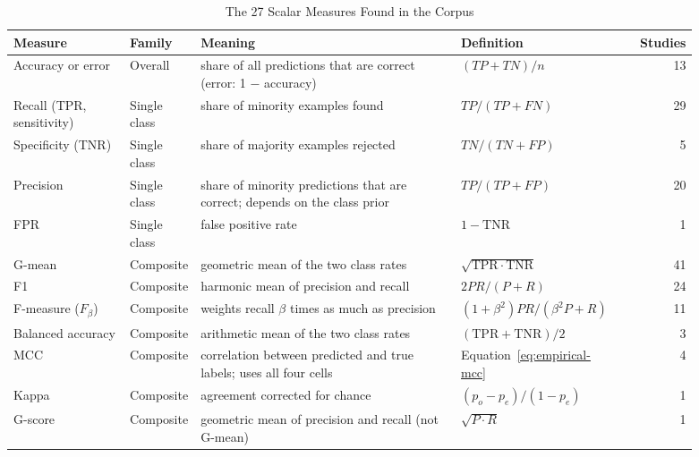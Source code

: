 \begin{table}[p]
  \caption{The 27 Scalar Measures Found in the Corpus}
  \label{tab:empirical-measure-defs}
  \footnotesize
  \setlength{\tabcolsep}{3pt}
  \begin{tabular}{@{}>{\raggedright\arraybackslash}p{0.17\linewidth}>{\raggedright\arraybackslash}p{0.1\linewidth}>{\raggedright\arraybackslash}p{0.38\linewidth}>{\raggedright\arraybackslash}p{0.24\linewidth}r@{}}
    \toprule
    Measure & Family & Meaning & Definition & Studies\\
    \midrule
    Accuracy or error & Overall & share of all predictions that are correct (error: 1 $-$ accuracy) & $(TP + TN)/n$ & 13\\
    \midrule
    Recall (TPR, sensitivity) & Single class & share of minority examples found & $TP/(TP + FN)$ & 29\\
    Specificity (TNR) & Single class & share of majority examples rejected & $TN/(TN + FP)$ & 5\\
    Precision & Single class & share of minority predictions that are correct; depends on the class prior & $TP/(TP + FP)$ & 20\\
    FPR & Single class & false positive rate & $1 - \mathrm{TNR}$ & 1\\
    \midrule
    G-mean & Composite & geometric mean of the two class rates & $\sqrt{\mathrm{TPR}\cdot\mathrm{TNR}}$ & 41\\
    F1 & Composite & harmonic mean of precision and recall & $2PR/(P + R)$ & 24\\
    F-measure ($F_\beta$) & Composite & weights recall $\beta$ times as much as precision & $(1 + \beta^2)PR/(\beta^2 P + R)$ & 11\\
    Balanced accuracy & Composite & arithmetic mean of the two class rates & $(\mathrm{TPR} + \mathrm{TNR})/2$ & 3\\
    MCC & Composite & correlation between predicted and true labels; uses all four cells & Equation~\ref{eq:empirical-mcc} & 4\\
    Kappa & Composite & agreement corrected for chance & $(p_o - p_e)/(1 - p_e)$ & 1\\
    G-score & Composite & geometric mean of precision and recall (not G-mean) & $\sqrt{P \cdot R}$ & 1\\

\end{tabular}
\end{table}
